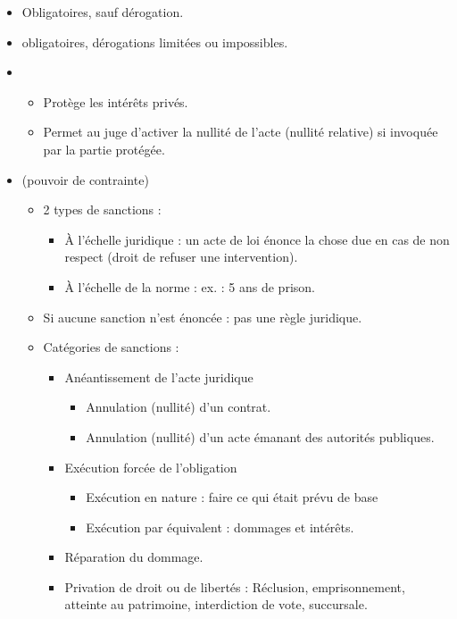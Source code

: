 \begin{itemize}
    \item {} Obligatoires, sauf dérogation.
    \item {} obligatoires, dérogations limitées ou impossibles.
    \item {}
    \begin{itemize}
        \item Protège les intérêts privés.
        \item Permet au juge d'activer la nullité de l'acte (nullité relative) si invoquée par la partie protégée.
    \end{itemize}
    \item {} (pouvoir de contrainte)
        \begin{itemize}
            \item 2 types de sanctions :
            \begin{itemize}
                \item À l'échelle juridique : un acte de loi énonce la chose due en cas de non respect (droit de refuser une intervention).
                \item À l'échelle de la norme : ex. : 5 ans de prison.
            \end{itemize}
            \item Si aucune sanction n'est énoncée : pas une règle juridique.
            \item Catégories de sanctions :
            \begin{itemize}
                \item Anéantissement de l'acte juridique
                \begin{itemize}
                    \item Annulation (nullité) d'un contrat.
                    \item Annulation (nullité) d'un acte émanant des autorités publiques.
                \end{itemize}
                \item Exécution forcée de l'obligation
                \begin{itemize}
                    \item Exécution en nature : faire ce qui était prévu de base
                    \item Exécution par équivalent : dommages et intérêts.
                \end{itemize}
                \item Réparation du dommage.
                \item Privation de droit ou de libertés : Réclusion, emprisonnement, atteinte au patrimoine, interdiction de vote, succursale.
            \end{itemize}
        \end{itemize}
\end{itemize}

